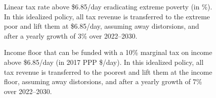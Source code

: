 \begin{figure}[!htb]
  \caption[Anti-acute-poverty tax above \$6.85/day after 3\% growth (HFCE-scaled).]{Linear tax rate above \$6.85/day eradicating extreme poverty (in \%). In this idealized policy, all tax revenue is transferred to the extreme poor and lift them at \$6.85/day, assuming away distorsions, and after a yearly growth of 3\% over 2022--2030. 
  }\label{fig:antipoverty_7_tax_7_average}
\end{figure}

\begin{figure}[!htb]
  \caption[Income floor of 10\% tax above \$6.85/day after 7\% growth.]{Income floor that can be funded with a 10\% marginal tax on income above \$6.85/day (in 2017 PPP \$/day). In this idealized policy, all tax revenue is transferred to the poorest and lift them at the income floor, assuming away distorsions, and after a yearly growth of 7\% over 2022--2030. 
  }\label{fig:demogrant_7__10_very_optimistic}
\end{figure}

